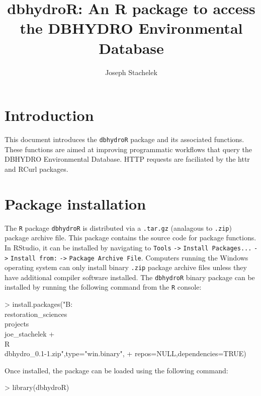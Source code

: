 \documentclass[12pt,notitlepage]{article}
\author{Joseph Stachelek}
\title{dbhydroR: An R package to access the DBHYDRO Environmental Database}
\begin{document}

\maketitle
 


\section{Introduction}

This document introduces the \texttt{dbhydroR} package and its associated functions. These functions are aimed at improving programmatic workflows that query the DBHYDRO Environmental Database. HTTP requests are faciliated by the httr \citep{httr} and RCurl \citep{rcurl} packages. 

\section{Package installation}

The \texttt{R} package \texttt{dbhydroR} is distributed via a \texttt{.tar.gz} (analagous to \texttt{.zip}) package archive file. This package contains the source code for package functions. In RStudio, it can be installed by navigating to \texttt{Tools} \verb|->| \texttt{Install Packages...} \verb|->| \texttt{Install from:} \verb|->| \texttt{Package Archive File}. Computers running the Windows operating system can only install binary \texttt{.zip} package archive files unless they have additional compiler software installed. The \texttt{dbhydroR} binary package can be installed by running the following command from the \texttt{R} console:


\begin{Schunk}
\begin{Sinput}
> install.packages("B:\\restoration_sciences\\projects\\joe_stachelek
+                 \\R\\dbhydro_0.1-1.zip",type="win.binary",
+                 repos=NULL,dependencies=TRUE)
\end{Sinput}
\end{Schunk}

Once installed, the package can be loaded using the following command:



\begin{Schunk}
\begin{Sinput}
> library(dbhydroR)
\end{Sinput}
\end{Schunk}
\end{document}
